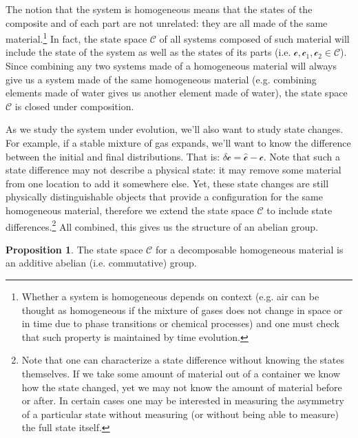 \documentclass[aps,pra,10pt,twocolumn,floatfix,nofootinbib]{revtex4-1}
\numberwithin{equation}{section}
\theoremstyle{definition}
\newtheorem{prop}[equation]{Proposition}
\begin{document}
The notion that the system is homogeneous means that the states of the composite and of each part are not unrelated: they are all made of the same material.\footnote{Whether a system is homogeneous depends on context (e.g. air can be thought as homogeneous if the mixture of gases does not change in space or in time due to phase transitions or chemical processes) and one must check that such property is maintained by time evolution.} In fact, the state space $\mathcal{C}$ of all systems composed of such material will include the state of the system as well as the states of  its parts (i.e. $\mathcal{c}, \mathcal{c}_1, \mathcal{c}_2 \in \mathcal{C}$). Since combining any two systems made of a homogeneous material will always give us a system made of the same homogeneous material (e.g. combining elements made of water gives us another element made of water), the state space $\mathcal{C}$ is closed under composition.

As we study the system under evolution, we'll also want to study state changes. For example, if a stable mixture of gas expands, we'll want to know the difference between the initial and final distributions. That is: $\delta\mathcal{c}=\hat{\mathcal{c}}-\mathcal{c}$. Note that such a state difference may not describe a physical state: it may remove some material from one location to add it somewhere else. Yet, these state changes are still physically distinguishable objects that provide a configuration for the same homogeneous material, therefore we extend the state space $\mathcal{C}$ to include state differences.\footnote{Note that one can characterize a state difference without knowing the states themselves. If we take some amount of material out of a container we know how the state changed, yet we may not know the amount of material before or after. In certain cases one may be interested in measuring the asymmetry of a particular state without measuring (or without being able to measure) the full state itself.} All combined, this gives us the structure of an abelian group.

\begin{prop}\label{prop:abelian_group}
The state space $\mathcal{C}$ for a decomposable homogeneous material is an additive abelian (i.e. commutative) group.
\end{prop}
\end{document}

